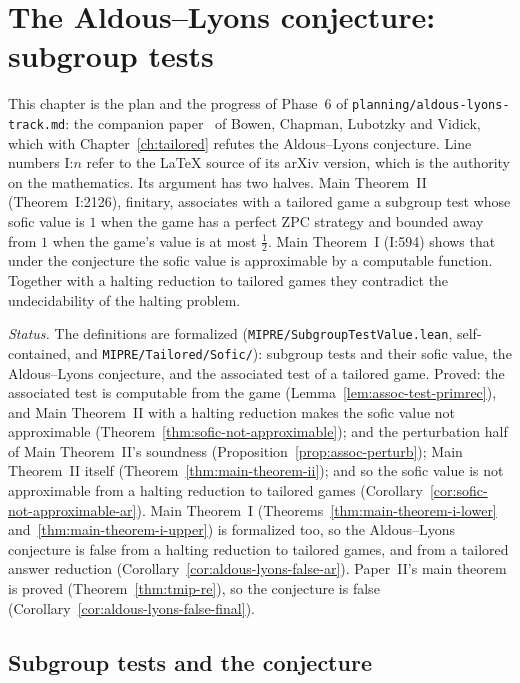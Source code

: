 \section{The Aldous--Lyons conjecture: subgroup tests}
\label{ch:subgroup-tests}

This chapter is the plan and the progress of Phase~6 of \texttt{planning/aldous-lyons-track.md}:
the companion paper~\cite{BCLV24} of Bowen, Chapman, Lubotzky and Vidick, which with
Chapter~\ref{ch:tailored} refutes the Aldous--Lyons conjecture. Line numbers I:$n$ refer to the
LaTeX source of its arXiv version, which is the authority on the mathematics. Its argument has
two halves. Main Theorem~II (Theorem~I:2126), finitary, associates with a tailored game a
subgroup test whose sofic value is $1$ when the game has a perfect ZPC strategy and bounded away
from $1$ when the game's value is at most $\frac12$. Main Theorem~I (I:594) shows that under the
conjecture the sofic value is approximable by a computable function. Together with a halting
reduction to tailored games they contradict the undecidability of the halting problem.

\emph{Status.} The definitions are formalized (\texttt{MIPRE/SubgroupTestValue.lean},
self-contained, and \texttt{MIPRE/Tailored/Sofic/}): subgroup tests and their sofic value, the
Aldous--Lyons conjecture, and the associated test of a tailored game. Proved: the associated
test is computable from the game (Lemma~\ref{lem:assoc-test-primrec}), and Main Theorem~II with a
halting reduction makes the sofic value not approximable
(Theorem~\ref{thm:sofic-not-approximable}); and the perturbation half of Main Theorem~II's
soundness (Proposition~\ref{prop:assoc-perturb}); Main Theorem~II itself
(Theorem~\ref{thm:main-theorem-ii}); and so the sofic value is not approximable from a halting
reduction to tailored games (Corollary~\ref{cor:sofic-not-approximable-ar}). Main Theorem~I
(Theorems~\ref{thm:main-theorem-i-lower} and~\ref{thm:main-theorem-i-upper}) is formalized too, so
the Aldous--Lyons conjecture is false from a halting reduction to tailored games, and from a
tailored answer reduction (Corollary~\ref{cor:aldous-lyons-false-ar}). Paper~II's main theorem is
proved (Theorem~\ref{thm:tmip-re}), so the conjecture is false
(Corollary~\ref{cor:aldous-lyons-false-final}).

\subsection{Subgroup tests and the conjecture}

